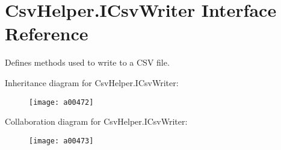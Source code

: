 \hypertarget{a00119}{\section{Csv\-Helper.\-I\-Csv\-Writer Interface Reference}
\label{a00119}
}


Defines methods used to write to a C\-S\-V file.  




Inheritance diagram for Csv\-Helper.\-I\-Csv\-Writer\-:
\nopagebreak
\begin{figure}[H]
\begin{center}
\leavevmode
\texttt{[image: a00472]}
\end{center}
\end{figure}


Collaboration diagram for Csv\-Helper.\-I\-Csv\-Writer\-:
\nopagebreak
\begin{figure}[H]
\begin{center}
\leavevmode
\texttt{[image: a00473]}
\end{center}
\end{figure}
